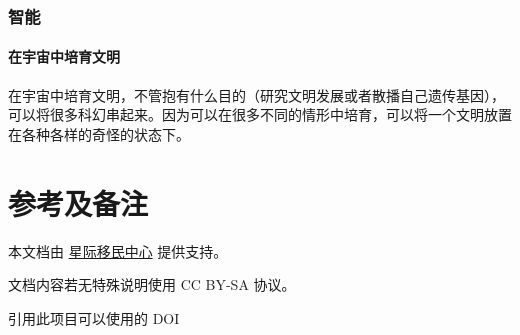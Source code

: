 \documentclass[letterpaper,10pt,english]{sphinxmanual}
\begin{document}
\subsection{智能}
\label{misc:id2}

\subsubsection{在宇宙中培育文明}
\label{misc:id3}
在宇宙中培育文明，不管抱有什么目的（研究文明发展或者散播自己遗传基因），可以将很多科幻串起来。因为可以在很多不同的情形中培育，可以将一个文明放置在各种各样的奇怪的状态下。


\chapter{参考及备注}
\label{index:id3}
本文档由 \href{http://interimm.github.io/}{星际移民中心} 提供支持。

文档内容若无特殊说明使用 CC BY-SA 协议。

引用此项目可以使用的 DOI
\href{http://dx.doi.org/10.5281/zenodo.13220}{}


\renewcommand{\indexname}{Index}
\printindex
\end{document}

